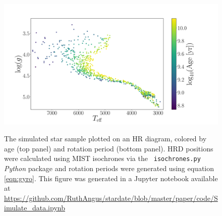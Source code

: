 \begin{figure}
  \caption{
      The simulated star sample plotted on an HR diagram, colored by age
    (top panel) and rotation period (bottom panel).
    HRD positions were calculated using MIST isochrones via the {\tt
    isochrones.py} {\it Python} package and rotation periods were generated
    using equation \ref{eqn:gyro}.
    This figure was generated in a Jupyter notebook available at
    \url{https://github.com/RuthAngus/stardate/blob/master/paper/code/Simulate_data.ipynb}
}
  \centering
    \includegraphics[width=1\textwidth]{simulated_CMD}
\label{fig:CMD_age}
\end{figure}

